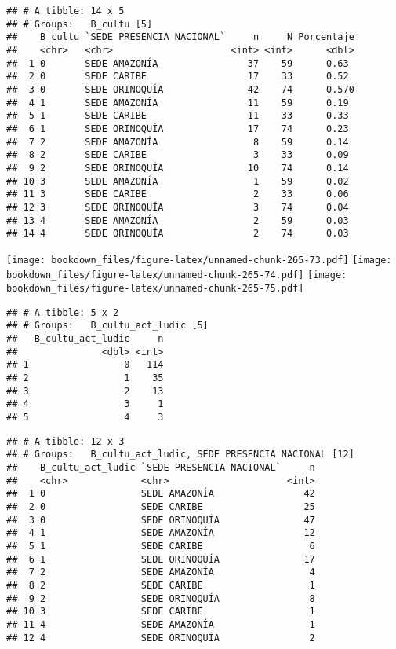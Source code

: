 \documentclass[]{article}
\theoremstyle{definition}
\theoremstyle{definition}
\theoremstyle{definition}
\theoremstyle{remark}
\begin{document}
\begin{verbatim}
## # A tibble: 14 x 5
## # Groups:   B_cultu [5]
##    B_cultu `SEDE PRESENCIA NACIONAL`     n     N Porcentaje
##    <chr>   <chr>                     <int> <int>      <dbl>
##  1 0       SEDE AMAZONÍA                37    59      0.63 
##  2 0       SEDE CARIBE                  17    33      0.52 
##  3 0       SEDE ORINOQUÍA               42    74      0.570
##  4 1       SEDE AMAZONÍA                11    59      0.19 
##  5 1       SEDE CARIBE                  11    33      0.33 
##  6 1       SEDE ORINOQUÍA               17    74      0.23 
##  7 2       SEDE AMAZONÍA                 8    59      0.14 
##  8 2       SEDE CARIBE                   3    33      0.09 
##  9 2       SEDE ORINOQUÍA               10    74      0.14 
## 10 3       SEDE AMAZONÍA                 1    59      0.02 
## 11 3       SEDE CARIBE                   2    33      0.06 
## 12 3       SEDE ORINOQUÍA                3    74      0.04 
## 13 4       SEDE AMAZONÍA                 2    59      0.03 
## 14 4       SEDE ORINOQUÍA                2    74      0.03
\end{verbatim}

\texttt{[image: bookdown\_files/figure-latex/unnamed-chunk-265-73.pdf]}
\texttt{[image: bookdown\_files/figure-latex/unnamed-chunk-265-74.pdf]}
\texttt{[image: bookdown\_files/figure-latex/unnamed-chunk-265-75.pdf]}

\begin{verbatim}
## # A tibble: 5 x 2
## # Groups:   B_cultu_act_ludic [5]
##   B_cultu_act_ludic     n
##               <dbl> <int>
## 1                 0   114
## 2                 1    35
## 3                 2    13
## 4                 3     1
## 5                 4     3
\end{verbatim}

\begin{verbatim}
## # A tibble: 12 x 3
## # Groups:   B_cultu_act_ludic, SEDE PRESENCIA NACIONAL [12]
##    B_cultu_act_ludic `SEDE PRESENCIA NACIONAL`     n
##    <chr>             <chr>                     <int>
##  1 0                 SEDE AMAZONÍA                42
##  2 0                 SEDE CARIBE                  25
##  3 0                 SEDE ORINOQUÍA               47
##  4 1                 SEDE AMAZONÍA                12
##  5 1                 SEDE CARIBE                   6
##  6 1                 SEDE ORINOQUÍA               17
##  7 2                 SEDE AMAZONÍA                 4
##  8 2                 SEDE CARIBE                   1
##  9 2                 SEDE ORINOQUÍA                8
## 10 3                 SEDE CARIBE                   1
## 11 4                 SEDE AMAZONÍA                 1
## 12 4                 SEDE ORINOQUÍA                2
\end{verbatim}
\end{document}
